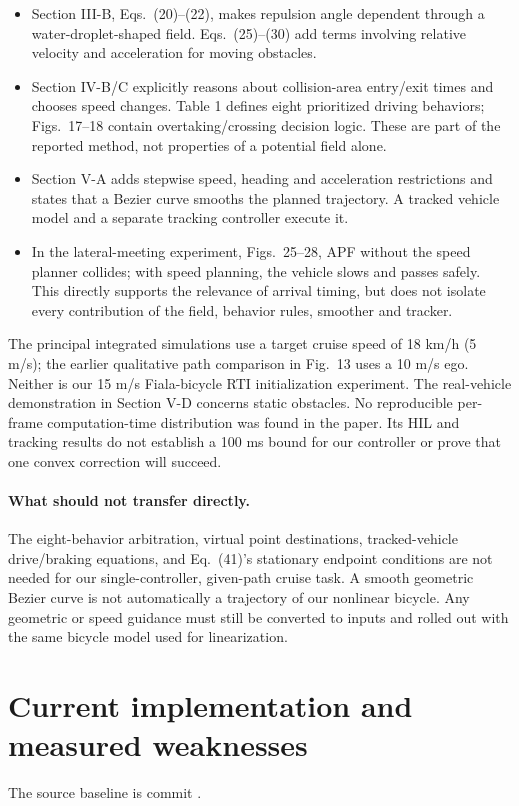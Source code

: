 \documentclass[10pt]{article}
\begin{document}
\begin{itemize}
\item Section III-B, Eqs.\ (20)--(22), makes repulsion angle dependent through
  a water-droplet-shaped field. Eqs.\ (25)--(30) add terms involving relative
  velocity and acceleration for moving obstacles.
\item Section IV-B/C explicitly reasons about collision-area entry/exit times
  and chooses speed changes. Table 1 defines eight prioritized driving
  behaviors; Figs.\ 17--18 contain overtaking/crossing decision logic.
  These are part of the reported method, not properties of a potential field
  alone.
\item Section V-A adds stepwise speed, heading and acceleration restrictions
  and states that a Bezier curve smooths the planned trajectory. A tracked
  vehicle model and a separate tracking controller execute it.
\item In the lateral-meeting experiment, Figs.\ 25--28, APF without the speed
  planner collides; with speed planning, the vehicle slows and passes safely.
  This directly supports the relevance of arrival timing, but does not isolate
  every contribution of the field, behavior rules, smoother and tracker.
\end{itemize}

The principal integrated simulations use a target cruise speed of 18 km/h
(5 m/s); the earlier qualitative path comparison in Fig.\ 13 uses a 10 m/s
ego. Neither is our 15 m/s Fiala-bicycle RTI initialization experiment.
The real-vehicle demonstration in Section V-D concerns static obstacles.
No reproducible per-frame computation-time distribution was found in the
paper. Its HIL and tracking results do not establish a 100 ms bound for our
controller or prove that one convex correction will succeed.

\paragraph{What should not transfer directly.}
The eight-behavior arbitration, virtual point destinations, tracked-vehicle
drive/braking equations, and Eq.\ (41)'s stationary endpoint conditions are not
needed for our single-controller, given-path cruise task. A smooth geometric
Bezier curve is not automatically a trajectory of our nonlinear bicycle.
Any geometric or speed guidance must still be converted to inputs and rolled
out with the same bicycle model used for linearization.

\section{Current implementation and measured weaknesses}
The source baseline is commit
.
\end{document}
